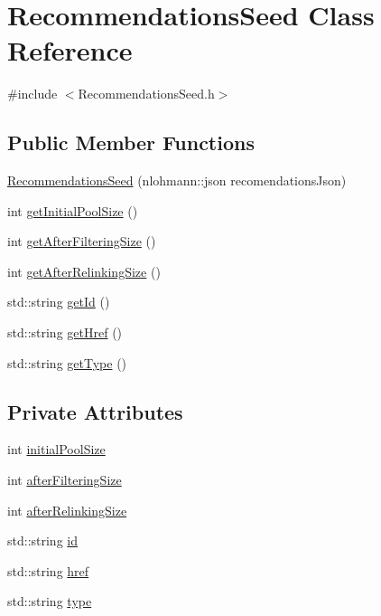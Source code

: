 \hypertarget{class_recommendations_seed}{}\section{Recommendations\+Seed Class Reference}
\label{class_recommendations_seed}


{\ttfamily \#include $<$Recommendations\+Seed.\+h$>$}

\subsection*{Public Member Functions}
\begin{DoxyCompactItemize}
\item 
\mbox{\hyperlink{class_recommendations_seed_a9e207c7f524d52dea0941721469913d4}{Recommendations\+Seed}} (nlohmann\+::json recomendations\+Json)
\item 
int \mbox{\hyperlink{class_recommendations_seed_a328237fc030c6930800def2c2853a7a8}{get\+Initial\+Pool\+Size}} ()
\item 
int \mbox{\hyperlink{class_recommendations_seed_a9241776384a2751f3c9bd84b932579b6}{get\+After\+Filtering\+Size}} ()
\item 
int \mbox{\hyperlink{class_recommendations_seed_ae50b0b01f49abf93f8ebdfa3c789fc54}{get\+After\+Relinking\+Size}} ()
\item 
std\+::string \mbox{\hyperlink{class_recommendations_seed_ad93af1864849b40cb7dee96cf8a434c4}{get\+Id}} ()
\item 
std\+::string \mbox{\hyperlink{class_recommendations_seed_ae5c119d327f2531da8bb0cccba4bec67}{get\+Href}} ()
\item 
std\+::string \mbox{\hyperlink{class_recommendations_seed_a68257f3ff5c11f18da18b3d2611fdbc4}{get\+Type}} ()
\end{DoxyCompactItemize}
\subsection*{Private Attributes}
\begin{DoxyCompactItemize}
\item 
int \mbox{\hyperlink{class_recommendations_seed_a15ac2549a6ed64e919e73e520b6cfacb}{initial\+Pool\+Size}}
\item 
int \mbox{\hyperlink{class_recommendations_seed_a322d672999401bba58248acbd6e22bc4}{after\+Filtering\+Size}}
\item 
int \mbox{\hyperlink{class_recommendations_seed_a5941b5db2e90a0e3fe781ff73c472087}{after\+Relinking\+Size}}
\item 
std\+::string \mbox{\hyperlink{class_recommendations_seed_aeaee32e184980ff04daa08cf910d5b0d}{id}}
\item 
std\+::string \mbox{\hyperlink{class_recommendations_seed_a40602bc1adc033392d5388a04071a422}{href}}
\item 
std\+::string \mbox{\hyperlink{class_recommendations_seed_a0075ed90bfd92d19ddf32ed0de82c5bf}{type}}
\end{DoxyCompactItemize}



